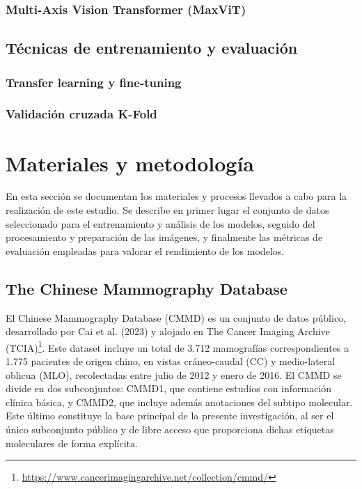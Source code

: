\documentclass[a4paper,10pt]{book}
\begin{document}
\subsection{Multi-Axis Vision Transformer (MaxViT)}
\section{Técnicas de entrenamiento y evaluación}
\subsection{Transfer learning y fine-tuning}
\subsection{Validación cruzada K-Fold}



\chapter{Materiales y metodología}

En esta sección se documentan los materiales y procesos llevados a cabo para la realización de este estudio. Se describe en primer lugar el conjunto de datos seleccionado para el entrenamiento y análisis de los modelos, seguido del procesamiento y preparación de las imágenes, y finalmente las métricas de evaluación empleadas para valorar el rendimiento de los modelos.

\section{The Chinese Mammography Database}

El Chinese Mammography Database (CMMD) es un conjunto de datos público, desarrollado por Cai et al. (2023) \cite{cai_online_2023} y alojado en The Cancer Imaging Archive (TCIA)\footnote{\url{https://www.cancerimagingarchive.net/collection/cmmd/}}. Este dataset incluye un total de 3.712 mamografías correspondientes a 1.775 pacientes de origen chino, en vistas cráneo-caudal (CC) y medio-lateral oblicua (MLO), recolectadas entre julio de 2012 y enero de 2016. El CMMD se divide en dos subconjuntos: CMMD1, que contiene estudios con información clínica básica, y CMMD2, que incluye además anotaciones del subtipo molecular. Este último constituye la base principal de la presente investigación, al ser el único subconjunto público y de libre acceso que proporciona dichas etiquetas moleculares de forma explícita.
\end{document}
